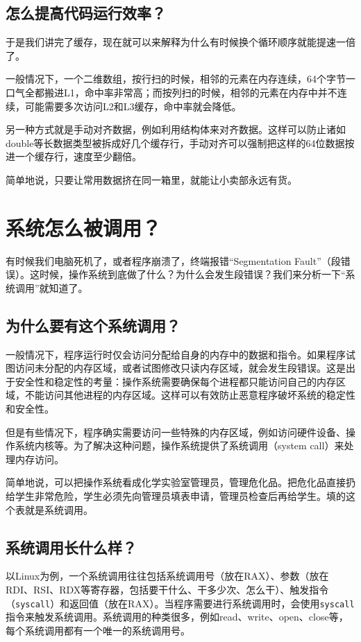 \documentclass[../main.tex]{subfiles}
\begin{document}
\subsection{怎么提高代码运行效率？}
于是我们讲完了缓存，现在就可以来解释为什么有时候换个循环顺序就能提速一倍了。

一般情况下，一个二维数组，按行扫的时候，相邻的元素在内存连续，64个字节一口气全都搬进L1，命中率非常高；而按列扫的时候，相邻的元素在内存中并不连续，可能需要多次访问L2和L3缓存，命中率就会降低。

另一种方式就是手动对齐数据，例如利用结构体来对齐数据。这样可以防止诸如double等长数据类型被拆成好几个缓存行，手动对齐可以强制把这样的64位数据按进一个缓存行，速度至少翻倍。

简单地说，只要让常用数据挤在同一箱里，就能让小卖部永远有货。

\section{系统怎么被调用？}

有时候我们电脑死机了，或者程序崩溃了，终端报错“Segmentation Fault”（段错误）。这时候，操作系统到底做了什么？为什么会发生段错误？我们来分析一下“系统调用”就知道了。

\subsection{为什么要有这个系统调用？}

一般情况下，程序运行时仅会访问分配给自身的内存中的数据和指令。如果程序试图访问未分配的内存区域，或者试图修改只读内存区域，就会发生段错误。这是出于安全性和稳定性的考量：操作系统需要确保每个进程都只能访问自己的内存区域，不能访问其他进程的内存区域。这样可以有效防止恶意程序破坏系统的稳定性和安全性。

但是有些情况下，程序确实需要访问一些特殊的内存区域，例如访问硬件设备、操作系统内核等。为了解决这种问题，操作系统提供了系统调用（system call）来处理内存访问。

简单地说，可以把操作系统看成化学实验室管理员，管理危化品。把危化品直接扔给学生非常危险，学生必须先向管理员填表申请，管理员检查后再给学生。填的这个表就是系统调用。

\subsection{系统调用长什么样？}

以Linux为例，一个系统调用往往包括系统调用号（放在RAX）、参数（放在RDI、RSI、RDX等寄存器，包括要干什么、干多少次、怎么干）、触发指令（\texttt{syscall}）和返回值（放在RAX）。当程序需要进行系统调用时，会使用\texttt{syscall}指令来触发系统调用。系统调用的种类很多，例如read、write、open、close等，每个系统调用都有一个唯一的系统调用号。
\end{document}
